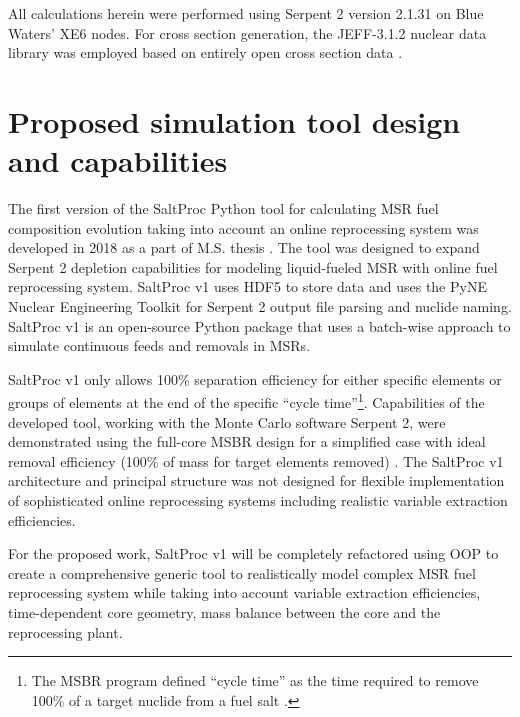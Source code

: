 All calculations herein were performed using Serpent 2 version 2.1.31 on Blue 
Waters’ XE6 nodes. For cross section generation, the JEFF-3.1.2 nuclear data 
library was employed based on entirely open cross section data 
\cite{oecd/nea_data_bank_jeff-3.1.2_2014}. 

\section{Proposed simulation tool design and capabilities} \label{sec:tool_design}
The first version of the SaltProc Python tool for calculating \gls{MSR} fuel 
composition evolution taking into account an online reprocessing system 
was developed in 2018 as a part of M.S. thesis \cite{rykhlevskii_advanced_2018,
	rykhlevskii_arfc/saltproc_2018}. The tool was designed to 
expand Serpent 2 depletion capabilities for modeling liquid-fueled \gls{MSR} 
with online fuel reprocessing system. SaltProc v1 uses HDF5 
\cite{the_hdf_group_hierarchical_1997} to store 
data and uses the PyNE Nuclear Engineering Toolkit \cite{scopatz_pyne_2012}
for Serpent 2 output file parsing and nuclide naming. SaltProc v1 is an 
open-source Python package that uses a batch-wise approach to simulate 
continuous feeds and removals in \glspl{MSR}. 

SaltProc v1 only allows 100\% separation efficiency for either specific 
elements or groups of elements at the end of the specific ``cycle 
time''\footnote{The \gls{MSBR} program defined ``cycle time'' as the time 
required to remove 100\% of a target nuclide from a fuel salt 
\cite{robertson_conceptual_1971}.}. Capabilities of the developed tool, 
working with the Monte Carlo software Serpent 2, were demonstrated using the 
full-core MSBR design for a simplified case with ideal removal efficiency 
(100\% of mass for target elements removed) \cite{rykhlevskii_modeling_2019}. 
The SaltProc v1 architecture and principal structure was not designed for 
flexible implementation of sophisticated online reprocessing systems including 
realistic variable extraction efficiencies. 

For the proposed work, SaltProc v1 will be completely refactored using 
\gls{OOP} to create a comprehensive generic tool to realistically model 
complex \gls{MSR} fuel reprocessing system while taking into account 
variable extraction efficiencies, time-dependent core geometry, mass balance 
between the core and the reprocessing plant.


